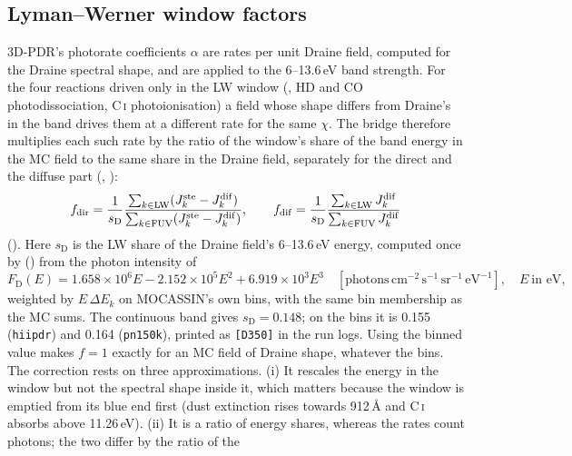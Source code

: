 \subsection{Lyman--Werner window factors}
\label{sec:window}

3D-PDR's photorate coefficients $\alpha$ are rates per unit Draine field,
computed for the Draine spectral shape, and are applied to the 6--13.6\,eV band
strength. For the four reactions driven only in the LW window (\Htwo, HD and
CO photodissociation, C\,\textsc{i} photoionisation) a field whose shape differs
from Draine's in the band drives them at a different rate for the same $\chi$.
The bridge therefore multiplies each such rate by the ratio of the window's
share of the band energy in the MC field to the same share in the Draine field,
separately for the direct and the diffuse part (, ):
\begin{equation}
  f_{\mathrm{dir}} = \frac{1}{s_{\mathrm D}}
     \frac{\sum_{k\in\mathrm{LW}}(J^{\mathrm{ste}}_k-J^{\mathrm{dif}}_k)}{\sum_{k\in\mathrm{FUV}}(J^{\mathrm{ste}}_k-J^{\mathrm{dif}}_k)},
  \qquad
  f_{\mathrm{dif}} = \frac{1}{s_{\mathrm D}}
     \frac{\sum_{k\in\mathrm{LW}}J^{\mathrm{dif}}_k}{\sum_{k\in\mathrm{FUV}}J^{\mathrm{dif}}_k}
  \label{eq:window}
\end{equation}
(). Here $s_{\mathrm D}$ is the LW share of the
Draine field's 6--13.6\,eV energy, computed once by 
() from the photon intensity of
\citet[eq.~11, given there as valid over 5--13.6\,eV]{Draine1978}
\begin{equation}
  F_{\mathrm D}(E) = 1.658\times10^{6}E - 2.152\times10^{5}E^2 + 6.919\times10^{3}E^3
  \quad [\mathrm{photons\,cm^{-2}\,s^{-1}\,sr^{-1}\,eV^{-1}}],\quad E\ \text{in eV},
  \label{eq:draine}
\end{equation}
weighted by $E\,\Delta E_k$ on MOCASSIN's own bins, with the same bin
membership as the MC sums. The continuous band gives $s_{\mathrm D}=0.148$; on
the bins it is 0.155 (\texttt{hiipdr}) and 0.164 (\texttt{pn150k}), printed as
\texttt{[D350]} in the run logs. Using the binned value makes $f=1$ exactly for
an MC field of Draine shape, whatever the bins.
The correction rests on three approximations. (i) It rescales the energy in
the window but not the spectral shape inside it, which matters because the
window is emptied from its blue end first (dust extinction rises towards
912\,\AA{} and C\,\textsc{i} absorbs above 11.26\,eV). (ii) It is a ratio of energy
shares, whereas the rates count photons; the two differ by the ratio of the
